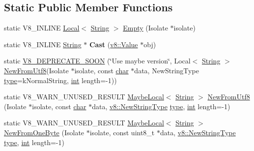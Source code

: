 \subsection*{Static Public Member Functions}
\begin{DoxyCompactItemize}
\item 
static V8\+\_\+\+I\+N\+L\+I\+NE \mbox{\hyperlink{classv8_1_1Local}{Local}}$<$ \mbox{\hyperlink{classv8_1_1String}{String}} $>$ \mbox{\hyperlink{classv8_1_1String_aa393d47baa54467fe57001065e49194b}{Empty}} (Isolate $\ast$isolate)
\item 
\mbox{\label{classv8_1_1String_a826d60798dc152cea64a7636737b03b9}} 
static V8\+\_\+\+I\+N\+L\+I\+NE \mbox{\hyperlink{classv8_1_1String}{String}} $\ast$ {\bfseries Cast} (\mbox{\hyperlink{classv8_1_1Value}{v8\+::\+Value}} $\ast$obj)
\item 
static \mbox{\hyperlink{classv8_1_1String_aa9d64688e3535b3daabafcc46a59ce5a}{V8\+\_\+\+D\+E\+P\+R\+E\+C\+A\+T\+E\+\_\+\+S\+O\+ON}} (\char`\"{}Use maybe version\char`\"{}, Local$<$ \mbox{\hyperlink{classv8_1_1String}{String}} $>$ \mbox{\hyperlink{classv8_1_1String_a745e88987f6d7e01cb82e12ab9fc8703}{New\+From\+Utf8}}(Isolate $\ast$isolate, const \mbox{\hyperlink{classchar}{char}} $\ast$data, New\+String\+Type \mbox{\hyperlink{classstd_1_1conditional_1_1type}{type}}=k\+Normal\+String, \mbox{\hyperlink{classint}{int}} length=-\/1))
\item 
static V8\+\_\+\+W\+A\+R\+N\+\_\+\+U\+N\+U\+S\+E\+D\+\_\+\+R\+E\+S\+U\+LT \mbox{\hyperlink{classv8_1_1MaybeLocal}{Maybe\+Local}}$<$ \mbox{\hyperlink{classv8_1_1String}{String}} $>$ \mbox{\hyperlink{classv8_1_1String_a745e88987f6d7e01cb82e12ab9fc8703}{New\+From\+Utf8}} (Isolate $\ast$isolate, const \mbox{\hyperlink{classchar}{char}} $\ast$data, \mbox{\hyperlink{namespacev8_ac9163ab12fb3b2a95907a3a0367c6095}{v8\+::\+New\+String\+Type}} \mbox{\hyperlink{classstd_1_1conditional_1_1type}{type}}, \mbox{\hyperlink{classint}{int}} length=-\/1)
\item 
static V8\+\_\+\+W\+A\+R\+N\+\_\+\+U\+N\+U\+S\+E\+D\+\_\+\+R\+E\+S\+U\+LT \mbox{\hyperlink{classv8_1_1MaybeLocal}{Maybe\+Local}}$<$ \mbox{\hyperlink{classv8_1_1String}{String}} $>$ \mbox{\hyperlink{classv8_1_1String_ac9e61b74b58ad14389882c5030843972}{New\+From\+One\+Byte}} (Isolate $\ast$isolate, const uint8\+\_\+t $\ast$data, \mbox{\hyperlink{namespacev8_ac9163ab12fb3b2a95907a3a0367c6095}{v8\+::\+New\+String\+Type}} \mbox{\hyperlink{classstd_1_1conditional_1_1type}{type}}, \mbox{\hyperlink{classint}{int}} length=-\/1)

\end{DoxyCompactItemize}

